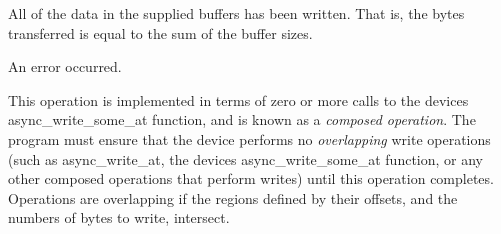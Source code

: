 \begin{DoxyItemize}
\item All of the data in the supplied buffers has been written. That is, the bytes transferred is equal to the sum of the buffer sizes.\end{DoxyItemize}
\begin{DoxyItemize}
\item An error occurred.\end{DoxyItemize}
This operation is implemented in terms of zero or more calls to the device\textquotesingle{}s async\+\_\+write\+\_\+some\+\_\+at function, and is known as a {\itshape composed operation}. The program must ensure that the device performs no {\itshape overlapping} write operations (such as async\+\_\+write\+\_\+at, the device\textquotesingle{}s async\+\_\+write\+\_\+some\+\_\+at function, or any other composed operations that perform writes) until this operation completes. Operations are overlapping if the regions defined by their offsets, and the numbers of bytes to write, intersect.


